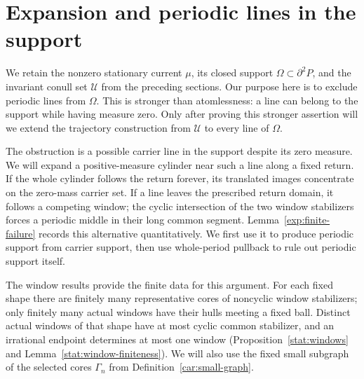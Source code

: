 \section{Expansion and periodic lines in the support}
\label{exp:section}

We retain the nonzero stationary current $\mu$, its closed support
$\Omega\subset\partial^2P$, and the invariant conull set $\mathcal U$
from the preceding sections. Our purpose here is to exclude periodic
lines from $\Omega$. This is stronger than atomlessness: a line can belong
to the support while having measure zero. Only after proving this stronger
assertion will we extend the trajectory construction from $\mathcal U$
to every line of $\Omega$.

The obstruction is a possible carrier line in the support despite its
zero measure. We will expand a positive-measure cylinder near such a
line along a fixed return. If the whole cylinder follows the return
forever, its translated images concentrate on the zero-mass carrier
set. If a line leaves the prescribed return domain, it follows a
competing window; the cyclic intersection of the two window stabilizers
forces a periodic middle in their long common segment. Lemma~\ref{exp:finite-failure}
records this alternative quantitatively. We first use it to produce
periodic support from carrier support, then use whole-period pullback
to rule out periodic support itself.

The window results provide the finite data for this argument. For each
fixed shape there are finitely many representative cores of noncyclic
window stabilizers; only finitely many actual windows have their hulls
meeting a fixed ball. Distinct actual windows of that shape have at
most cyclic common stabilizer, and an irrational endpoint determines
at most one window (Proposition~\ref{stat:windows} and
Lemma~\ref{stat:window-finiteness}). We will also use the fixed small
subgraph of the selected cores $\Gamma_n$ from
Definition~\ref{car:small-graph}.

